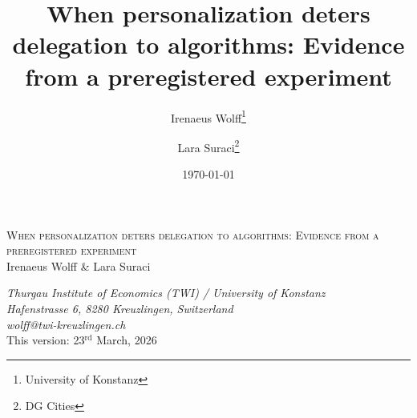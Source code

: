 \documentclass[12pt,a4paper]{article}
\title{When personalization deters delegation to algorithms: Evidence from a preregistered experiment}
\author{Irenaeus Wolff\footnote{University of Konstanz} \and Lara Suraci\footnote{DG Cities}}
\date{\today}
\title{\mytitle}
\date{}
\newcommand{\mytitle}{{\Large \textsc{When personalization deters delegation to algorithms: Evidence from a preregistered experiment}}}
\begin{document}
	
	\thispagestyle{empty}
	\begin{center}
		\mytitle{}
		\vspace{.55cm}\\
		Irenaeus Wolff \& Lara Suraci
		\\\vspace{.35cm}
		\begin{small}
			\textit{Thurgau Institute of Economics (TWI) / University of Konstanz\\ Hafenstrasse 6, 8280 Kreuzlingen, Switzerland\\ wolff@twi-kreuzlingen.ch}\vspace{.03cm}\\
			\vspace{.6cm}
			{This version: 23$^{\text{rd}}$ March, 2026}
			\vspace{.6cm}
		\end{small}
	\end{center}





\label{sec:literature}


\label{sec:method}


\label{sec:results}







\end{document}
